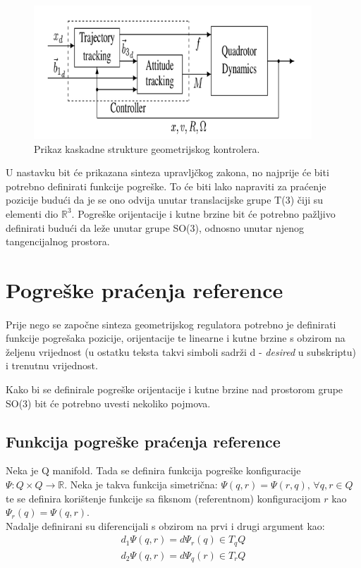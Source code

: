 \documentclass[times, utf8, diplomski]{fer}
\begin{document}
	\newpage
	\clearpage

	\begin{figure}[h!]
		\includegraphics[width=\textwidth, height=5cm]{figures/controller.png}
		\caption{Prikaz kaskadne strukture geometrijskog kontrolera.}
	\end{figure}
	
	U nastavku bit će prikazana sinteza upravljčkog zakona, no najprije će biti potrebno definirati funkcije pogreške. To će biti lako napraviti za praćenje pozicije budući da je se ono odvija unutar translacijske grupe T(3) čiji su elementi dio $\mathbb{R}^3$. Pogreške orijentacije i kutne brzine bit će potrebno pažljivo definirati budući da leže unutar grupe SO(3), odnosno unutar njenog tangencijalnog prostora.
	
\section{Pogreške praćenja reference}

	\paragraph{}Prije nego se započne sinteza geometrijskog regulatora potrebno je definirati funkcije pogrešaka pozicije, orijentacije te linearne i kutne brzine s obzirom na željenu vrijednost (u ostatku teksta takvi simboli sadrži d - \textit{desired} u subskriptu) i trenutnu vrijednost.
	
	\noindent Kako bi se definirale pogreške orijentacije i kutne brzine nad prostorom grupe SO(3) bit će potrebno uvesti nekoliko pojmova.
	\subsection{Funkcija pogreške praćenja reference} Neka je Q manifold. Tada se definira funkcija pogreške konfiguracije $\Psi : Q \times Q \rightarrow \mathbb{R}$. Neka je takva funkcija simetrična: $\Psi(q, r) = \Psi(r, q), \, \forall q,r\in Q$ te se definira korištenje funkcije sa fiksnom (referentnom) konfiguracijom $r$ kao $\Psi_r(q) = \Psi(q, r)$. \\
	Nadalje definirani su diferencijali s obzirom na prvi i drugi argument kao: 
	\begin{gather}
		d_1 \Psi (q, r) = d \Psi_r(q) \in T_q Q \\
		d_2 \Psi (q, r) = d \Psi_q(r) \in T_r Q
	\end{gather}
	
\end{document}
